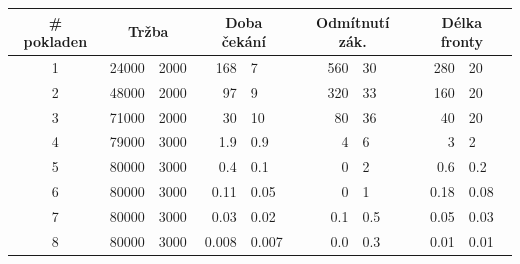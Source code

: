 \documentclass[a4paper,12pt]{article}
\begin{document}
\begin{tabular}{c|r@{$\pm$}l|r@{$\pm$}l|r@{$\pm$}l|r@{$\pm$}l}
	\# pokladen & \multicolumn{2}{|c|}{Tržba} & \multicolumn{2}{|c|}{Doba čekání} & \multicolumn{2}{|c|}{Odmítnutí zák.} & \multicolumn{2}{|c}{Délka fronty}\\ \hline\hline	
	1 &   24000 & 2000  &  168     &  7      &  560   & 30    &  280    & 20    \\
	2 &   48000 & 2000  &   97     &  9      &  320   & 33    &  160    & 20    \\
	3 &   71000 & 2000  &   30     & 10      &   80   & 36    &   40    & 20    \\
	4 &   79000 & 3000  &    1.9   &  0.9    &    4   &  6    &    3    &  2    \\
	5 &   80000 & 3000  &    0.4   &  0.1    &    0   &  2    &    0.6  &  0.2  \\
	6 &   80000 & 3000  &    0.11  &  0.05   &    0   &  1    &    0.18 &  0.08 \\
	7 &   80000 & 3000  &    0.03  &  0.02   &    0.1 &  0.5  &    0.05 &  0.03 \\
	8 &   80000 & 3000  &    0.008 &  0.007  &    0.0 &  0.3  &    0.01 &  0.01 
\end{tabular}
\end{document}
